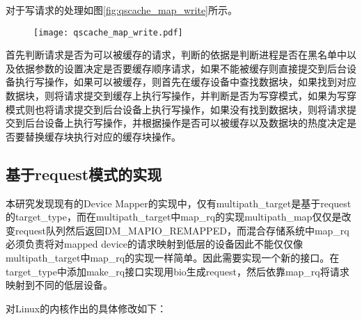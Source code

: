 对于写请求的处理如图\ref{fig:qscache_map_write}所示。


\begin{figure}[!htbp]
    \centering
    \texttt{[image: qscache\_map\_write.pdf]}
\end{figure}

首先判断请求是否为可以被缓存的请求，判断的依据是判断进程是否在黑名单中以及依据参数的设置决定是否要缓存顺序请求，如果不能被缓存则直接提交到后台设备执行写操作，如果可以被缓存，则首先在缓存设备中查找数据块，如果找到对应数据块，则将请求提交到缓存上执行写操作，并判断是否为写穿模式，如果为写穿模式则也将请求提交到后台设备上执行写操作，如果没有找到数据块，则将请求提交到后台设备上执行写操作，并根据操作是否可以被缓存以及数据块的热度决定是否要替换缓存块执行对应的缓存块操作。


\subsection{基于request模式的实现}

本研究发现现有的Device Mapper的实现中，仅有multipath\_target是基于request的target\_type，而在multipath\_target中map\_rq的实现multipath\_map仅仅是改变request队列然后返回DM\_MAPIO\_REMAPPED，而混合存储系统中map\_rq必须负责将对mapped device的请求映射到低层的设备因此不能仅仅像multipath\_target中map\_rq的实现一样简单。因此需要实现一个新的接口。在target\_type中添加make\_rq接口实现用bio生成request，然后依靠map\_rq将请求映射到不同的低层设备。

对Linux的内核作出的具体修改如下：


